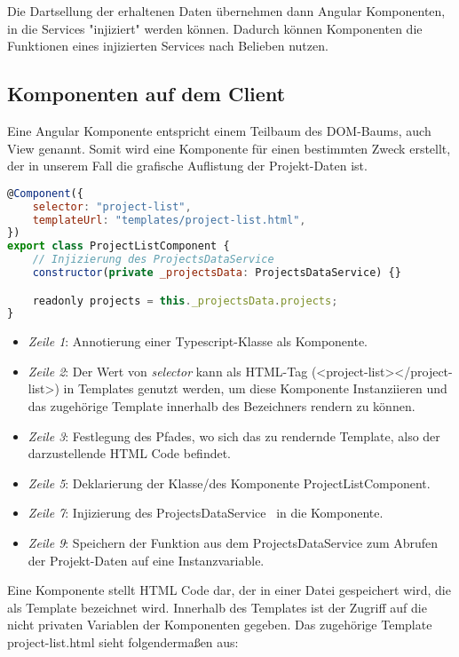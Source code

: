 Die Dartsellung der erhaltenen Daten übernehmen dann Angular Komponenten, in die Services "injiziert" werden können.
Dadurch können Komponenten die Funktionen eines injizierten Services nach Belieben nutzen.

\subsection{Komponenten auf dem Client}
\label{sec:requirements:example:component}

Eine Angular Komponente entspricht einem Teilbaum des DOM-Baums, auch View genannt.
Somit wird eine Komponente für einen bestimmten Zweck erstellt,
der in unserem Fall die grafische Auflistung der Projekt-Daten ist.

\begin{lstlisting}[language=JavaScript,float=h!,caption={Funktion zum Abruf aller Projekte vom Server}, label={lst:example:component}]
@Component({
    selector: "project-list",
    templateUrl: "templates/project-list.html",
})
export class ProjectListComponent {
    // Injizierung des ProjectsDataService
    constructor(private _projectsData: ProjectsDataService) {}

    readonly projects = this._projectsData.projects;
}
\end{lstlisting}

\begin{itemize}
    \setlength\itemsep{-1em}
    \item \emph{Zeile 1}: Annotierung einer Typescript-Klasse als Komponente.
    \item \emph{Zeile 2}: Der Wert von \emph{selector} kann als HTML-Tag (<project-list></project-list>) in Templates genutzt werden,
    um diese Komponente Instanziieren und das zugehörige Template innerhalb des Bezeichners rendern zu können.
    \item \emph{Zeile 3}: Festlegung des Pfades, wo sich das zu rendernde Template, also der darzustellende HTML Code befindet.
    \item \emph{Zeile 5}: Deklarierung der Klasse/des Komponente ProjectListComponent.
    \item \emph{Zeile 7}: Injizierung des ProjectsDataService~\cite{angular-http} in die Komponente.
    \item \emph{Zeile 9}: Speichern der Funktion aus dem ProjectsDataService zum Abrufen der Projekt-Daten auf eine Instanzvariable.
\end{itemize}

Eine Komponente stellt HTML Code dar, der in einer Datei gespeichert wird, die als Template bezeichnet wird.
Innerhalb des Templates ist der Zugriff auf die nicht privaten Variablen der Komponenten gegeben.
Das zugehörige Template project-list.html sieht folgendermaßen aus:

